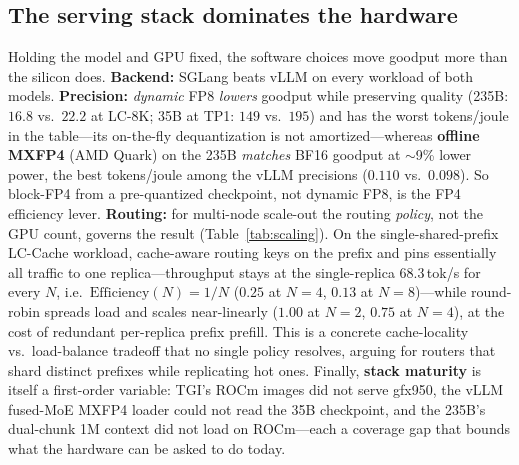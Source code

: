 \subsection{The serving stack dominates the hardware}
\label{subsec:insight-stack}
Holding the model and GPU fixed, the software choices move goodput more than the
silicon does. \textbf{Backend:} SGLang beats vLLM on every workload of both models.
\textbf{Precision:} \emph{dynamic} FP8 \emph{lowers} goodput while preserving
quality (235B: $16.8$ vs.\ $22.2$ at LC-8K; 35B at TP1: $149$ vs.\ $195$) and has
the worst tokens/joule in the table---its on-the-fly dequantization is not
amortized---whereas \textbf{offline MXFP4} (AMD Quark) on the 235B \emph{matches}
BF16 goodput at $\sim$9\% lower power, the best tokens/joule among the vLLM
precisions ($0.110$ vs.\ $0.098$). So block-FP4 from a pre-quantized checkpoint, not
dynamic FP8, is the FP4 efficiency lever. \textbf{Routing:} for multi-node
scale-out the routing \emph{policy}, not the GPU count, governs the result
(Table~\ref{tab:scaling}). On the single-shared-prefix LC-Cache workload,
cache-aware routing keys on the prefix and pins essentially all traffic to one
replica---throughput stays at the single-replica $68.3$\,tok/s for every $N$, i.e.\
$\text{Efficiency}(N){=}1/N$ ($0.25$ at $N{=}4$, $0.13$ at $N{=}8$)---while
round-robin spreads load and scales near-linearly ($1.00$ at $N{=}2$, $0.75$ at
$N{=}4$), at the cost of redundant per-replica prefix prefill. This is a concrete
cache-locality vs.\ load-balance tradeoff that no single policy resolves, arguing
for routers that shard distinct prefixes while replicating hot ones. Finally,
\textbf{stack maturity} is itself a first-order variable: TGI's ROCm images did not
serve gfx950, the vLLM fused-MoE MXFP4 loader could not read the 35B checkpoint, and
the 235B's dual-chunk 1M context did not load on ROCm---each a coverage gap that
bounds what the hardware can be asked to do today.

